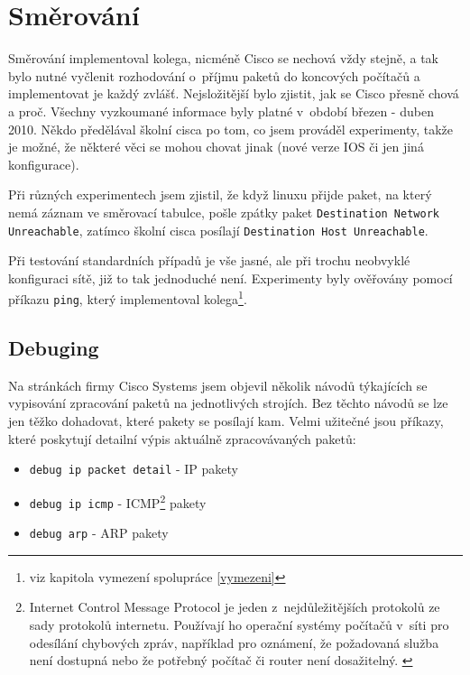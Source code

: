 \section{Směrování} \label{prijmiEthernetove}
Směrování implementoval kolega, nicméně Cisco se nechová vždy stejně, a tak bylo nutné vyčlenit rozhodování o~příjmu paketů do koncových počítačů a implementovat je každý zvlášť. Nejsložitější bylo zjistit, jak se Cisco přesně chová a proč. Všechny vyzkoumané informace byly platné v~období březen - duben 2010. Někdo předělával školní cisca po tom, co jsem prováděl experimenty, takže je možné, že některé věci se mohou chovat jinak (nové verze IOS či jen jiná konfigurace). 

Při různých experimentech jsem zjistil, že když linuxu přijde paket, na který nemá záznam ve směrovací tabulce, pošle zpátky paket \verb|Destination Network Unreachable|, zatímco školní cisca posílají \verb|Destination Host Unreachable|.

Při testování standardních případů je vše jasné, ale při trochu neobvyklé konfiguraci sítě, již to tak jednoduché není. Experimenty byly ověřovány pomocí příkazu \verb|ping|, který implementoval kolega\footnote{viz kapitola vymezení spolupráce \ref{vymezeni}}. 


\subsection{Debuging}
Na stránkách firmy Cisco Systems jsem objevil několik návodů týkajících se vypisování zpracování paketů na jednotlivých strojích. Bez těchto návodů se lze jen těžko dohadovat, které pakety se posílají kam. Velmi užitečné jsou příkazy, které poskytují detailní výpis aktuálně zpracovávaných paketů:

\begin{itemize}
 \item \verb|debug ip packet detail| - IP pakety 
 \item \verb|debug ip icmp| - ICMP\footnote{Internet Control Message Protocol je jeden z~nejdůležitějších protokolů ze sady protokolů internetu. Používají ho operační systémy počítačů v~síti pro odesílání chybových zpráv, například pro oznámení, že požadovaná služba není dostupná nebo že potřebný počítač či router není dosažitelný. \cite{wiki:icmp}} pakety
 \item \verb|debug arp| - ARP pakety
\end{itemize}

